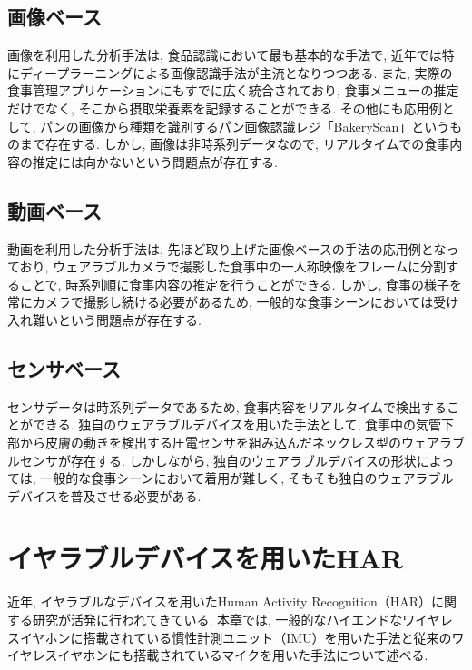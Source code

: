 \subsection{画像ベース}

画像を利用した分析手法は, 食品認識において最も基本的な手法で, 近年では特にディープラーニングによる画像認識手法が主流となりつつある\cite{10.1145/3063592}. また, 実際の食事管理アプリケーションにもすでに広く統合されており, 食事メニューの推定だけでなく, そこから摂取栄養素を記録することができる. その他にも応用例として, パンの画像から種類を識別するパン画像認識レジ「BakeryScan」というものまで存在する\cite{1523669555317207552}. しかし, 画像は非時系列データなので, リアルタイムでの食事内容の推定には向かないという問題点が存在する.

\subsection{動画ベース}

動画を利用した分析手法は, 先ほど取り上げた画像ベースの手法の応用例となっており, ウェアラブルカメラで撮影した食事中の一人称映像をフレームに分割することで, 時系列順に食事内容の推定を行うことができる\cite{10.1145/3551626.3564964}. しかし, 食事の様子を常にカメラで撮影し続ける必要があるため, 一般的な食事シーンにおいては受け入れ難いという問題点が存在する.

\subsection{センサベース}

センサデータは時系列データであるため, 食事内容をリアルタイムで検出することができる. 独自のウェアラブルデバイスを用いた手法として, 食事中の気管下部から皮膚の動きを検出する圧電センサを組み込んだネックレス型のウェアラブルセンサが存在する\cite{app12126135}. しかしながら, 独自のウェアラブルデバイスの形状によっては, 一般的な食事シーンにおいて着用が難しく, そもそも独自のウェアラブルデバイスを普及させる必要がある.

\section{イヤラブルデバイスを用いたHAR}

近年, イヤラブルなデバイスを用いたHuman Activity Recognition（HAR）に関する研究が活発に行われてきている. 本章では, 一般的なハイエンドなワイヤレスイヤホンに搭載されている慣性計測ユニット（IMU）を用いた手法と従来のワイヤレスイヤホンにも搭載されているマイクを用いた手法について述べる.


